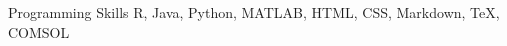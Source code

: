 

\begin{cvskills}



\cvskill
    {Programming Skills} %
    {R, Java, Python, MATLAB, HTML, CSS, Markdown, TeX, COMSOL} %
    

    


    

\end{cvskills}
